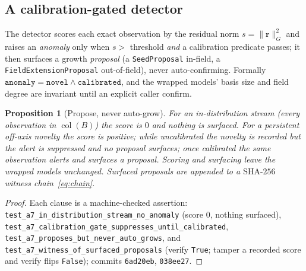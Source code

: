 \documentclass[11pt]{article}
\theoremstyle{plain}
\newtheorem{proposition}[theorem]{Proposition}
\theoremstyle{definition}
\theoremstyle{remark}
\newcommand{\rr}{\mathbf{r}}
\newcommand{\GG}{G}
\newcommand{\BB}{B}
\DeclareMathOperator{\col}{col}
\begin{document}
\subsection{A calibration-gated detector}
The detector scores each exact observation by the residual norm $s=\lVert\rr\rVert_\GG^2$ and raises an
\emph{anomaly} only when $s>$ threshold \emph{and} a calibration predicate passes; it then surfaces a growth
\emph{proposal} (a \texttt{SeedProposal} in-field, a \texttt{FieldExtensionProposal} out-of-field), never
auto-confirming. Formally $\texttt{anomaly}=\texttt{novel}\wedge\texttt{calibrated}$, and the wrapped models'
basis size and field degree are invariant until an explicit caller confirm.

\begin{proposition}[Propose, never auto-grow]\label{prop:detector}
For an in-distribution stream (every observation in $\col(\BB)$) the score is $0$ and nothing is surfaced.
For a persistent off-axis novelty the score is positive; while uncalibrated the novelty is recorded but the
alert is \emph{suppressed} and no proposal surfaces; once calibrated the same observation alerts and surfaces
a proposal. Scoring and surfacing leave the wrapped models unchanged. Surfaced proposals are appended to a
$\mathrm{SHA}\text{-}256$ witness chain~\eqref{eq:chain}.
\end{proposition}
\begin{proof}
Each clause is a machine-checked assertion:
\texttt{test\_a7\_in\_distribution\_stream\_no\_anomaly} (score $0$, nothing surfaced),
\texttt{test\_a7\_calibration\_gate\_suppresses\_until\_calibrated},
\texttt{test\_a7\_proposes\_but\_never\_auto\_grows}, and
\texttt{test\_a7\_witness\_of\_surfaced\_proposals} (verify \texttt{True}; tamper a recorded score and verify
flips \texttt{False}); commits \texttt{6ad20eb}, \texttt{038ee27}.
\end{proof}
\end{document}
